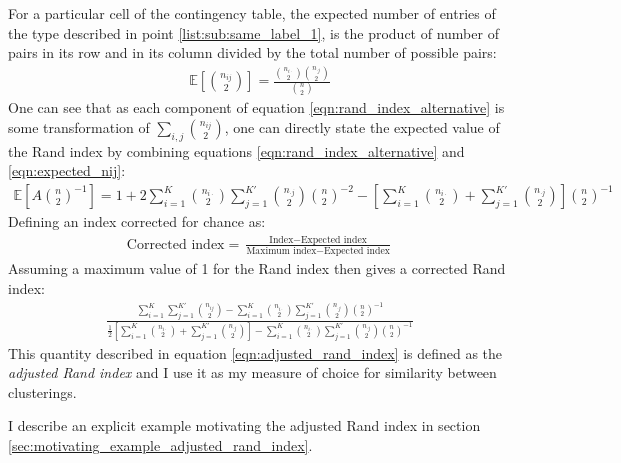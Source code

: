 \documentclass[12pt]{article} %
\begin{document}
For a particular cell of the contingency table, the expected number of entries of the type described in point \ref{list:sub:same_label_1}, is the product of number of pairs in its row and in its column divided by the total number of possible pairs:
\begin{eqnarray} \label{eqn:expected_nij}
\mathbb{E}\left[\binom{n_{ij}}{2}\right] = \frac{\binom{n_{i\cdot}}{2}\binom{n_{\cdot j}}{2}}{\binom{n}{2}}
\end{eqnarray}
One can see that as each component of equation \ref{eqn:rand_index_alternative} is some transformation of $\sum_{i,j}\binom{n_{ij}}{2}$, one can directly state the expected value of the Rand index by combining equations \ref{eqn:rand_index_alternative} and \ref{eqn:expected_nij}:
\begin{eqnarray}
\mathbb{E}\left[A \binom{n}{2}^{-1}\right] = 1 + 2 \sum_{i=1}^{K} \binom{n_{i \cdot}}{2} \sum_{j=1}^{K'} \binom{n_{\cdot j}}{2} \binom{n}{2}^{-2} - \left[\sum_{i=1}^{K} \binom{n_{i \cdot}}{2} + \sum_{j=1}^{K'} \binom{n_{\cdot j}}{2}\right] \binom{n}{2}^{-1}
\end{eqnarray}
Defining an index corrected for chance as:
\begin{eqnarray}
\text{Corrected index} = \frac{\text{Index} - \text{Expected index}}{\text{Maximum index} - \text{Expected index}}
\end{eqnarray}
Assuming a maximum value of 1 for the Rand index then gives a corrected Rand index:
\begin{eqnarray} \label{eqn:adjusted_rand_index}
\frac{\sum_{i=1}^{K}\sum_{j=1}^{K'} \binom{n_{ij}}{2} - \sum_{i=1}^{K} \binom{n_{i \cdot}}{2} \sum_{j=1}^{K'} \binom{n_{\cdot j}}{2} \binom{n}{2}^{-1}}{\frac{1}{2} \left[\sum_{i=1}^{K} \binom{n_{i \cdot}}{2} + \sum_{j=1}^{K'} \binom{n_{\cdot j}}{2}\right] - \sum_{i=1}^{K} \binom{n_{i \cdot}}{2} \sum_{j=1}^{K'} \binom{n_{\cdot j}}{2} \binom{n}{2}^{-1}}
\end{eqnarray}
This quantity described in equation \ref{eqn:adjusted_rand_index} is defined as the \emph{adjusted Rand index} and I use it as my measure of choice for similarity between clusterings.

I describe an explicit example motivating the adjusted Rand index in section \ref{sec:motivating_example_adjusted_rand_index}.
\end{document}

